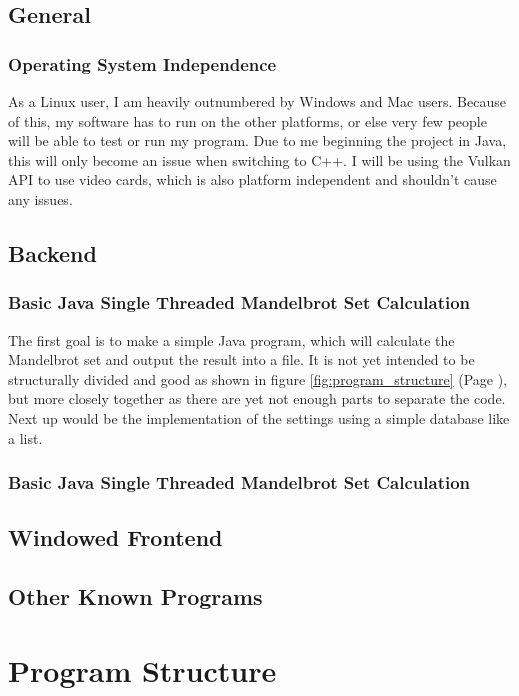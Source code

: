 \documentclass[10pt,a4paper,titlepage]{article}
\begin{document}
	\subsection{General}
	\subsubsection{Operating System Independence}
	As a Linux user, I am heavily outnumbered by Windows and Mac users. Because of this, my software has to run on the other platforms, or else very few people will be able to test or run my program. Due to me beginning the project in Java, this will only become an issue when switching to C++. I will be using the Vulkan API to use video cards, which is also platform independent and shouldn't cause any issues.
	\subsection{Backend}
	\subsubsection{Basic Java Single Threaded Mandelbrot Set Calculation}
	The first goal is to make a simple Java program, which will calculate the Mandelbrot set and output the result into a file. It is not yet intended to be structurally divided and good as shown in figure \ref{fig:program_structure} (Page \pageref{fig:program_structure}), but more closely together as there are yet not enough parts to separate the code.\\
	Next up would be the implementation of the settings using a simple database like a list.
	\subsubsection{Basic Java Single Threaded Mandelbrot Set Calculation}
	\subsection{Windowed Frontend}
	\subsection{Other Known Programs}
	
	\section{Program Structure}
	
	
\end{document}
